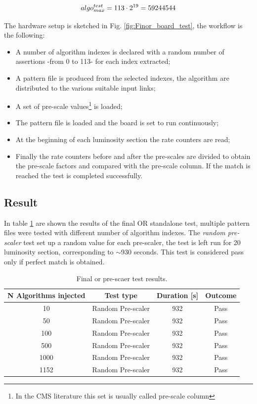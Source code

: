 \documentclass[../../main.tex]{subfiles}
\begin{document}
\begin{equation}
    algo_{max}^{test} = 113\cdot2^{19} = 59244544\\
    \label{eq:max_ass}
\end{equation}


The hardware setup is sketched in Fig. \ref{fig:Finor_board_test}, the workflow is the following:
\begin{itemize}
    \item A number of algorithm indexes is declared with a random number of assertions -from 0 to 113- for each index extracted;
    \item A pattern file is produced from the selected indexes, the algorithm are distributed to the various suitable input links;
    \item A set of pre-scale values\footnote{In the CMS literature this set is usually called pre-scale column} is loaded;
    \item The pattern file is loaded and the board is set to run continuously;
    \item At the beginning of each luminosity section the rate counters are read;
    \item Finally the rate counters before and after the pre-scales are divided to obtain the pre-scale factors and compared with the pre-scale column. If the match is reached the test is completed successfully. 
\end{itemize}

\subsection{Result}
In table \ref{tab:Finor_res} are shown the results of the final OR standalone test, multiple pattern files were tested with different number of algorithm indexes.
The \textit{random pre-scaler} test set up a random value for each pre-scaler, the test is left run for 20 luminosity section, corresponding to $\sim$930 seconds. 
This test is considered pass only if perfect match is obtained.


\begin{table}[h]
    \centering
    \begin{tabular}{|c|c|c|c|}
    \hline
    N Algorithms injected & Test type  & Duration [s]&  Outcome \\
    \hline
    10          & Random Pre-scaler    & 932 & Pass             \\
    50          & Random Pre-scaler    & 932 & Pass             \\
    100         & Random Pre-scaler    & 932 & Pass             \\
    500         & Random Pre-scaler    & 932 & Pass             \\
    1000        & Random Pre-scaler    & 932 & Pass             \\
    1152        & Random Pre-scaler    & 932 & Pass             \\
    \hline
    \end{tabular}
    \caption{Final or pre-scaer test results.}
    \label{tab:Finor_res}
\end{table}
\end{document}

